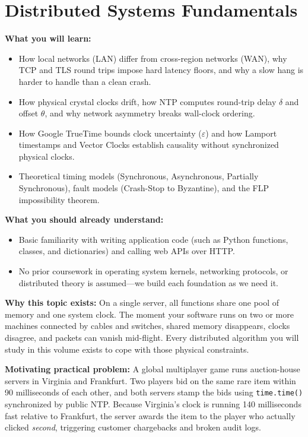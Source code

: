 \chapter{Distributed Systems Fundamentals}
\label{ch:distributed-fundamentals}

\begin{chaptergoalsbox}
\textbf{What you will learn:}
\begin{itemize}[leftmargin=12pt]
  \item How local networks (LAN) differ from cross-region networks (WAN), why TCP and TLS round trips impose hard latency floors, and why a slow hang is harder to handle than a clean crash.
  \item How physical crystal clocks drift, how NTP computes round-trip delay $\delta$ and offset $\theta$, and why network asymmetry breaks wall-clock ordering.
  \item How Google TrueTime bounds clock uncertainty ($\varepsilon$) and how Lamport timestamps and Vector Clocks establish causality without synchronized physical clocks.
  \item Theoretical timing models (Synchronous, Asynchronous, Partially Synchronous), fault models (Crash-Stop to Byzantine), and the FLP impossibility theorem.
\end{itemize}

\textbf{What you should already understand:}
\begin{itemize}[leftmargin=12pt]
  \item Basic familiarity with writing application code (such as Python functions, classes, and dictionaries) and calling web APIs over HTTP.
  \item No prior coursework in operating system kernels, networking protocols, or distributed theory is assumed---we build each foundation as we need it.
\end{itemize}

\textbf{Why this topic exists:}
On a single server, all functions share one pool of memory and one system clock. The moment your software runs on two or more machines connected by cables and switches, shared memory disappears, clocks disagree, and packets can vanish mid-flight. Every distributed algorithm you will study in this volume exists to cope with those physical constraints.

\textbf{Motivating practical problem:}
A global multiplayer game runs auction-house servers in Virginia and Frankfurt. Two players bid on the same rare item within 90 milliseconds of each other, and both servers stamp the bids using \texttt{time.time()} synchronized by public NTP. Because Virginia's clock is running 140 milliseconds fast relative to Frankfurt, the server awards the item to the player who actually clicked \emph{second}, triggering customer chargebacks and broken audit logs.
\end{chaptergoalsbox}


